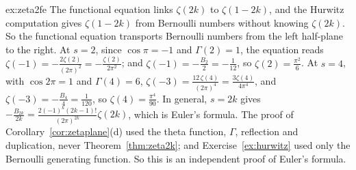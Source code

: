 \begin{solution}{ex:zeta2fe}
\idea The functional equation links $\zeta(2k)$ to $\zeta(1-2k)$, and the Hurwitz computation gives $\zeta(1-2k)$ from Bernoulli numbers without knowing
$\zeta(2k)$. So the functional equation transports Bernoulli numbers from the left half-plane to the right.
\writeup At $s=2$, since $\cos\pi=-1$ and $\Gamma(2)=1$, the equation reads $\zeta(-1)=-\frac{2\zeta(2)}{(2\pi)^2}=-\frac{\zeta(2)}{2\pi^2}$; and $\zeta(-1)=-\frac{B_2}2=-\frac1{12}$, so $\zeta(2)=\frac{\pi^2}6$. At $s=4$,
with $\cos2\pi=1$ and $\Gamma(4)=6$, $\zeta(-3)=\frac{12\,\zeta(4)}{(2\pi)^4}=\frac{3\zeta(4)}{4\pi^4}$, and $\zeta(-3)=-\frac{B_4}4=\frac1{120}$, so $\zeta(4)=\frac{\pi^4}{90}$. In general, $s=2k$ gives
$-\frac{B_{2k}}{2k}=\frac{2(-1)^k(2k-1)!}{(2\pi)^{2k}}\zeta(2k)$, which is Euler's formula. The proof of Corollary~\ref{cor:zetaplane}(d) used the theta function, $\Gamma$, reflection and duplication,
never Theorem~\ref{thm:zeta2k}; and Exercise~\ref{ex:hurwitz} used only the Bernoulli generating function. So this is an independent proof of Euler's formula.
\end{solution}

